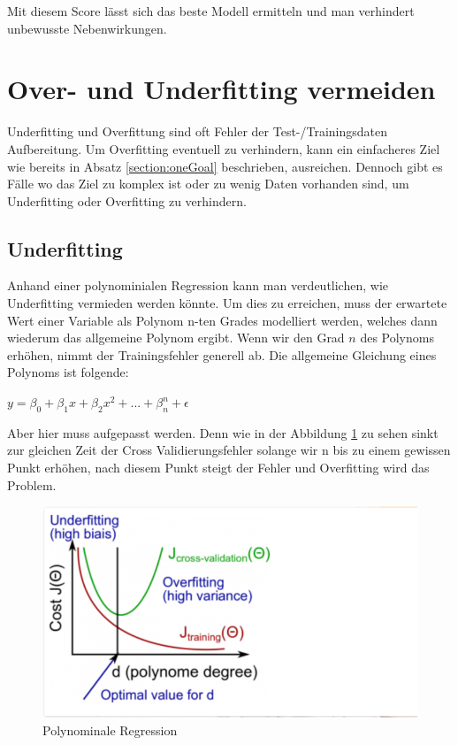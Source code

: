 \documentclass[12pt,oneside,a4paper,parskip]{scrbook}
\begin{document}
Mit diesem Score lässt sich das beste Modell ermitteln und man verhindert unbewusste Nebenwirkungen.

\section{Over- und Underfitting vermeiden}
\label{section:preventData}

Underfitting und Overfittung sind oft Fehler der Test-/Trainingsdaten Aufbereitung. Um Overfitting eventuell zu verhindern, kann ein einfacheres Ziel wie bereits in Absatz \ref{section:oneGoal} beschrieben, ausreichen. Dennoch gibt es Fälle wo das Ziel zu komplex ist oder zu wenig Daten vorhanden sind, um Underfitting oder Overfitting zu verhindern.

\subsection{Underfitting}

Anhand einer polynominialen Regression kann man verdeutlichen, wie Underfitting vermieden werden könnte. Um dies zu erreichen, muss der erwartete Wert einer Variable als Polynom n-ten Grades modelliert werden, welches dann wiederum das allgemeine Polynom ergibt. Wenn wir den Grad ${n}$ des Polynoms erhöhen, nimmt der Trainingsfehler generell ab. Die allgemeine Gleichung eines Polynoms ist folgende:

${\displaystyle y=\beta_{0}+\beta_{1}x+\beta_{2}x^{2}+...+\beta_{n}^n+\epsilon}$

Aber hier muss aufgepasst werden. Denn wie in der Abbildung \ref{fig:polyReg} zu sehen sinkt zur gleichen Zeit der Cross Validierungsfehler solange wir n bis zu einem gewissen Punkt erhöhen, nach diesem Punkt steigt der Fehler und Overfitting wird das Problem.

\begin{figure}[h]
	\begin{center}
		\includegraphics[width=15cm]{Bilder/polynomeRegression.png}
		\caption{Polynominale Regression}
		\label{fig:polyReg}
	\end{center}
\end{figure}
\end{document}
